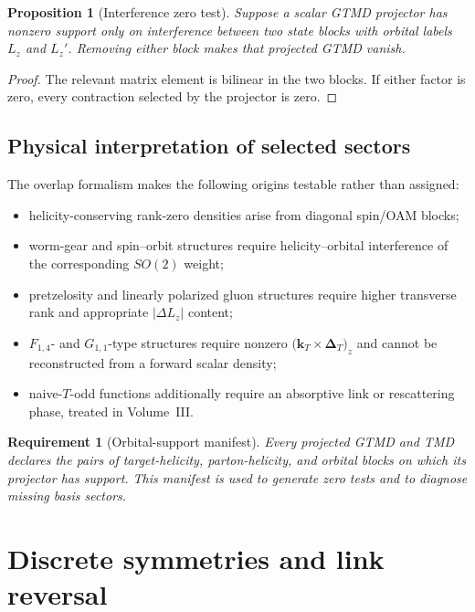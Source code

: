 \documentclass[11pt]{article}
\newtheorem{requirement}[definition]{Requirement}
\newtheorem{proposition}[definition]{Proposition}
\newcommand{\kT}{\bm{k}_{T}}
\newcommand{\DT}{\bm{\Delta}_{T}}
\newcommand{\crossT}[2]{\bigl(#1\!\times\!#2\bigr)_z}
\begin{document}
\begin{proposition}[Interference zero test]
\label{prop:interference-zero-test}
Suppose a scalar GTMD projector has nonzero support only on interference
between two state blocks with orbital labels \(L_z\) and \(L_z'\).  Removing
either block makes that projected GTMD vanish.
\end{proposition}

\begin{proof}
The relevant matrix element is bilinear in the two blocks.  If either factor
is zero, every contraction selected by the projector is zero.
\end{proof}

\subsection{Physical interpretation of selected sectors}

The overlap formalism makes the following origins testable rather than
assigned:
\begin{itemize}
\item helicity-conserving rank-zero densities arise from diagonal spin/OAM
      blocks;
\item worm-gear and spin--orbit structures require helicity--orbital
      interference of the corresponding \(SO(2)\) weight;
\item pretzelosity and linearly polarized gluon structures require higher
      transverse rank and appropriate \(|\Delta L_z|\) content;
\item \(F_{1,4}\)- and \(G_{1,1}\)-type structures require nonzero
      \(\crossT{\kT}{\DT}\) and cannot be reconstructed from a forward scalar
      density;
\item naive-\(T\)-odd functions additionally require an absorptive link or
      rescattering phase, treated in Volume~III.
\end{itemize}

\begin{requirement}[Orbital-support manifest]
\label{req:orbital-support-manifest}
Every projected GTMD and TMD declares the pairs of target-helicity,
parton-helicity, and orbital blocks on which its projector has support.  This
manifest is used to generate zero tests and to diagnose missing basis sectors.
\end{requirement}

\section{Discrete symmetries and link reversal}
\label{sec:symmetries}
\end{document}

